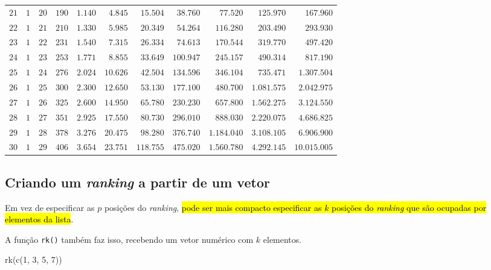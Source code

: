 \documentclass[
  letterpaper,
  DIV=11,
  numbers=noendperiod]{scrreprt}
\newenvironment{Shaded}{\begin{snugshade}}{\end{snugshade}}
\newcommand{\DecValTok}[1]{\textcolor[rgb]{0.68,0.00,0.00}{#1}}
\newcommand{\FunctionTok}[1]{\textcolor[rgb]{0.28,0.35,0.67}{#1}}
\newcommand{\NormalTok}[1]{\textcolor[rgb]{0.00,0.23,0.31}{#1}}
\begin{document}
\begin{longtable*}{l|rrrrrrrrrr}
$21$ & $1$ & $20$ & $190$ & $1.140$ & $4.845$ & $15.504$ & $38.760$ & $77.520$ & $125.970$ & $167.960$ \\ 
$22$ & $1$ & $21$ & $210$ & $1.330$ & $5.985$ & $20.349$ & $54.264$ & $116.280$ & $203.490$ & $293.930$ \\ 
$23$ & $1$ & $22$ & $231$ & $1.540$ & $7.315$ & $26.334$ & $74.613$ & $170.544$ & $319.770$ & $497.420$ \\ 
$24$ & $1$ & $23$ & $253$ & $1.771$ & $8.855$ & $33.649$ & $100.947$ & $245.157$ & $490.314$ & $817.190$ \\ 
$25$ & $1$ & $24$ & $276$ & $2.024$ & $10.626$ & $42.504$ & $134.596$ & $346.104$ & $735.471$ & $1.307.504$ \\ 
$26$ & $1$ & $25$ & $300$ & $2.300$ & $12.650$ & $53.130$ & $177.100$ & $480.700$ & $1.081.575$ & $2.042.975$ \\ 
$27$ & $1$ & $26$ & $325$ & $2.600$ & $14.950$ & $65.780$ & $230.230$ & $657.800$ & $1.562.275$ & $3.124.550$ \\ 
$28$ & $1$ & $27$ & $351$ & $2.925$ & $17.550$ & $80.730$ & $296.010$ & $888.030$ & $2.220.075$ & $4.686.825$ \\ 
$29$ & $1$ & $28$ & $378$ & $3.276$ & $20.475$ & $98.280$ & $376.740$ & $1.184.040$ & $3.108.105$ & $6.906.900$ \\ 
$30$ & $1$ & $29$ & $406$ & $3.654$ & $23.751$ & $118.755$ & $475.020$ & $1.560.780$ & $4.292.145$ & $10.015.005$ \\ 
\bottomrule
\end{longtable*}

\subsection{\texorpdfstring{Criando um \emph{ranking} a partir de um
vetor}{Criando um ranking a partir de um vetor}}\label{criando-um-ranking-a-partir-de-um-vetor}

Em vez de especificar as $p$ posições do \emph{ranking}, {\hl{pode ser
mais compacto especificar as $k$ posições do \emph{ranking} que são
ocupadas por elementos da lista}}.

A função \texttt{rk()} também faz isso, recebendo um vetor numérico com
$k$ elementos.

\begin{Shaded}
\begin{Highlighting}[]
\FunctionTok{rk}\NormalTok{(}\FunctionTok{c}\NormalTok{(}\DecValTok{1}\NormalTok{, }\DecValTok{3}\NormalTok{, }\DecValTok{5}\NormalTok{, }\DecValTok{7}\NormalTok{))}
\end{Highlighting}
\end{Shaded}
\end{document}
